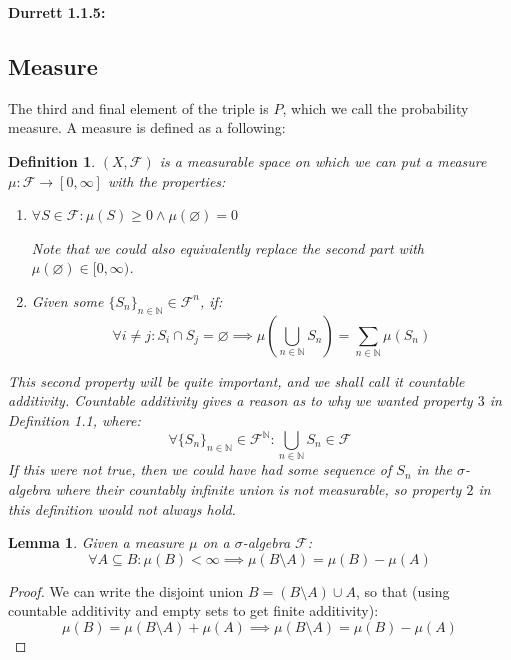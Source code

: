 \documentclass[10pt,letterpaper]{article} %
\newtheorem{lem}{Lemma}[section]
\newtheorem{defn}{Definition}[section]
\begin{document}

\textbf{Durrett 1.1.5:}

\pagebreak
\subsection{Measure}
The third and final element of the triple is $P$, which we call the probability measure. A measure is defined as a following:
\begin{defn}
$(X, \mathcal{F})$ is a measurable space on which we can put a measure $\mu: \mathcal{F} \xrightarrow{} [0, \infty]$ with the properties:
\begin{enumerate}
\item $\forall S \in \mathcal{F}: \mu(S) \geqslant 0 \land \mu(\varnothing) = 0$

Note that we could also equivalently replace the second part with $\mu(\varnothing) \in [0, \infty)$.
\item Given some $\{S_n\}_{n \in \mathbb{N}} \in \mathcal{F}^n$, if:
\begin{equation*}
\forall i \neq j: S_i \cap S_j = \varnothing \implies \mu\left(\bigcup_{n \in \mathbb{N}}S_n\right) = \sum_{n \in \mathbb{N}}\mu(S_n)
\end{equation*}
\end{enumerate}
This second property will be quite important, and we shall call it countable additivity. Countable additivity gives a reason as to why we wanted property $3$ in Definition 1.1, where:
\begin{equation*}
\forall \{S_n\}_{n \in \mathbb{N}} \in \mathcal{F}^\mathbb{N}: \bigcup_{n \in \mathbb{N}}S_n \in \mathcal{F}
\end{equation*}
If this were not true, then we could have had some sequence of $S_n$ in the $\sigma$-algebra where their countably infinite union is not measurable, so property $2$ in this definition would not always hold.
\end{defn}

\begin{lem}
Given a measure $\mu$ on a $\sigma$-algebra $\mathcal{F}$:
\begin{equation*}
\forall A \subseteq B: \mu(B) < \infty \implies \mu(B \setminus A) = \mu(B) - \mu(A) 
\end{equation*}
\end{lem}
\begin{proof}
We can write the disjoint union $B = (B \setminus A) \cup A$, so that (using countable additivity and empty sets to get finite additivity):
\begin{equation*}
\mu(B) = \mu(B \setminus A) + \mu(A) \implies \mu(B \setminus A) = \mu(B) - \mu(A)
\end{equation*}
\end{proof}
\end{document}
